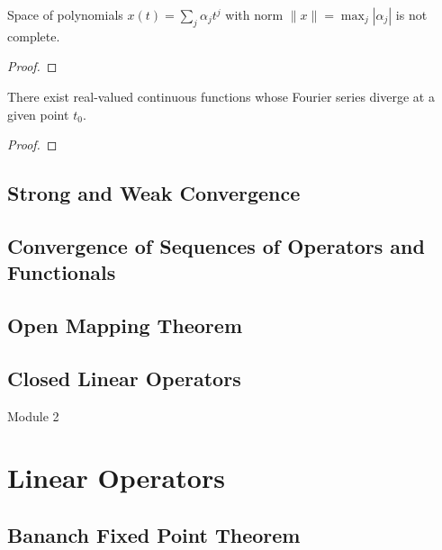 \begin{remark}
	Space of polynomials $x(t) = \sum_j \alpha_j t^j$ with norm $\|x\| = \max_j |\alpha_j|$ is not complete.
\end{remark}
\begin{proof}
\end{proof}

\begin{remark}
	There exist real-valued continuous functions whose Fourier series diverge at a given point $t_0$.
\end{remark}
\begin{proof}
\end{proof}

\subsection{Strong and Weak Convergence}
\subsection{Convergence of Sequences of Operators and Functionals}
\setcounter{subsection}{11}
\subsection{Open Mapping Theorem}
\subsection{Closed Linear Operators}
\pagebreak

{\Large Module 2}
\section{Linear Operators}
\subsection{Bananch Fixed Point Theorem}
\setcounter{section}{6}
